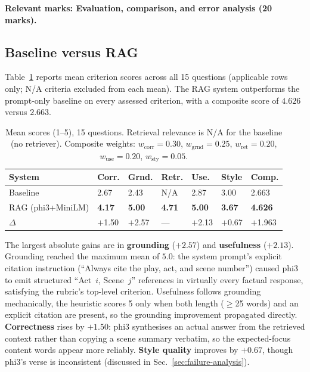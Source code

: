 \documentclass[10pt,conference]{IEEEtran}
\begin{document}
\textbf{Relevant marks: Evaluation, comparison, and error analysis (20 marks).}

\subsection{Baseline versus RAG}

Table~\ref{tab:evaluation-summary} reports mean criterion scores
across all 15 questions (applicable rows only; N/A criteria excluded
from each mean). The RAG system outperforms the prompt-only baseline
on every assessed criterion, with a composite score of $4.626$ versus
$2.663$.

\begin{table}[h]
\centering
\caption{Mean scores (1--5), 15 questions. Retrieval relevance is N/A
for the baseline (no retriever). Composite weights:
$w_\text{corr}=0.30$, $w_\text{grnd}=0.25$, $w_\text{ret}=0.20$,
$w_\text{use}=0.20$, $w_\text{sty}=0.05$.}
\label{tab:evaluation-summary}
\small
\begin{tabularx}{\linewidth}{lXXXXXX}
\toprule
System & Corr. & Grnd. & Retr. & Use. & Style & Comp. \\
\midrule
Baseline         & 2.67 & 2.43 & N/A  & 2.87 & 3.00 & 2.663 \\
RAG (phi3+MiniLM)& \textbf{4.17} & \textbf{5.00} & \textbf{4.71} & \textbf{5.00} & \textbf{3.67} & \textbf{4.626} \\
\midrule
$\Delta$         & $+$1.50 & $+$2.57 & --- & $+$2.13 & $+$0.67 & $+$1.963 \\
\bottomrule
\end{tabularx}
\end{table}

The largest absolute gains are in \textbf{grounding} ($+2.57$) and
\textbf{usefulness} ($+2.13$). Grounding reached the maximum mean of
$5.0$: the system prompt's explicit citation instruction (``Always
cite the play, act, and scene number'') caused phi3 to emit structured
``Act~$i$, Scene~$j$'' references in virtually every factual response,
satisfying the rubric's top-level criterion.
Usefulness follows grounding mechanically, the heuristic scores 5
only when both length ($\geq$25 words) and an explicit citation are
present, so the grounding improvement propagated directly.
\textbf{Correctness} rises by $+1.50$: phi3 synthesises an actual
answer from the retrieved context rather than copying a scene
summary verbatim, so the expected-focus content words appear more
reliably. \textbf{Style quality} improves by $+0.67$, though phi3's
verse is inconsistent (discussed in Sec.~\ref{sec:failure-analysis}).
\end{document}
